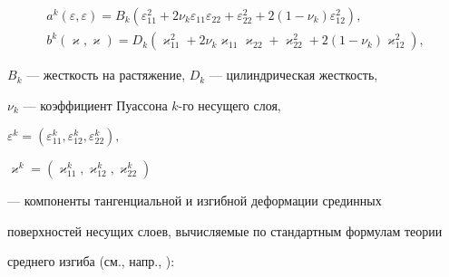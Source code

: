 \begin{align}


\label{guk1}


a^k(\varepsilon, \varepsilon) = B_k \left (\varepsilon^2_{11} +


2 \nu_k \varepsilon_{11}\varepsilon_{22} + \varepsilon_{22}^2 +


2 \left ( 1 - \nu_k \right ) \varepsilon_{12}^2 \right ),\\


%


\label{guk2}


b^k(\varkappa, \varkappa ) =


D_k \left ( \varkappa ^2_{11} +


2 \nu_k \varkappa _{11}\varkappa _{22} 


+ \varkappa _{22}^2 +


2 \left (1 - \nu_k \right )\varkappa _{12}^2 \right ),


\end{align}


$ B_k $ --- жесткость на растяжение, $D_k$ --- цилиндрическая жесткость, 


$\nu_k$ --- коэффициент Пуассона $k$-го несущего слоя, 


$ \varepsilon ^{k} = (\varepsilon ^{k}_{11}, \varepsilon ^{k}_{12},


 \varepsilon ^{k}_{22}),$ 


$\varkappa ^{k} = (\varkappa ^{k}_{11}, 


\varkappa ^{k}_{12}, \varkappa ^{k}_{22})


$


--- компоненты тангенциальной и изгибной деформации срединных 


поверхностей несущих слоев, вычисляемые по стандартным формулам теории 


среднего изгиба (см., напр., \cite{Mus}):


